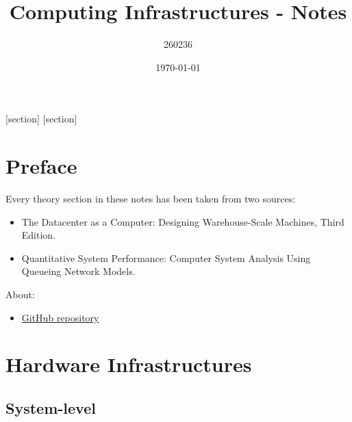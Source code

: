 \documentclass[a4paper]{article}
\begin{document}
    [section]
    [section]
    
    

    \author{260236}
	\title{Computing Infrastructures - Notes}
	\date{\printdayoff\today}
	\maketitle

	\newpage

    \section*{Preface}

    Every theory section in these notes has been taken from two sources:
    \begin{itemize}
        \item The Datacenter as a Computer: Designing Warehouse-Scale Machines, Third Edition.\cite{barroso2022datacenter}

        \item Quantitative System Performance: Computer System Analysis Using Queueing Network Models.\cite{lazowska1984quantitative}
    \end{itemize}
    About:
    \begin{itemize}
        \item[\faIcon{github}] \href{https://github.com/AndreVale69/HPC-E-PoliMI-university-notes}{GitHub repository}
    \end{itemize}
    
    \newpage
	
	\tableofcontents

    \newpage

    \section{Hardware Infrastructures}

    \subsection{System-level}
\end{document}
